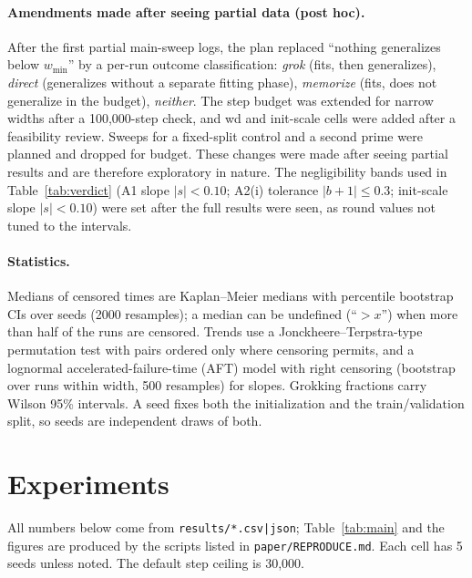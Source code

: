 \documentclass{article}
\begin{document}
\paragraph{Amendments made after seeing partial data (post hoc).}
After the first partial main-sweep logs, the plan replaced ``nothing generalizes below $w_{\min}$'' by a per-run outcome classification: \emph{grok} (fits, then generalizes), \emph{direct} (generalizes without a separate fitting phase), \emph{memorize} (fits, does not generalize in the budget), \emph{neither}. The step budget was extended for narrow widths after a 100{,}000-step check, and wd and init-scale cells were added after a feasibility review. Sweeps for a fixed-split control and a second prime were planned and dropped for budget. These changes were made after seeing partial results and are therefore exploratory in nature. The negligibility bands used in Table~\ref{tab:verdict} (A1 slope $|s|<0.10$; A2(i) tolerance $|b+1|\le0.3$; init-scale slope $|s|<0.10$) were set after the full results were seen, as round values not tuned to the intervals.

\paragraph{Statistics.}
Medians of censored times are Kaplan--Meier medians with percentile bootstrap CIs over seeds (2000 resamples); a median can be undefined (``$>x$'') when more than half of the runs are censored.
Trends use a Jonckheere--Terpstra-type permutation test with pairs ordered only where censoring permits, and a lognormal accelerated-failure-time (AFT) model with right censoring (bootstrap over runs within width, 500 resamples) for slopes.
Grokking fractions carry Wilson 95\% intervals. A seed fixes both the initialization and the train/validation split, so seeds are independent draws of both.

\section{Experiments}
\label{sec:exp}
All numbers below come from \texttt{results/*.csv|json}; Table~\ref{tab:main} and the figures are produced by the scripts listed in \texttt{paper/REPRODUCE.md}. Each cell has 5 seeds unless noted. The default step ceiling is 30{,}000.
\end{document}
